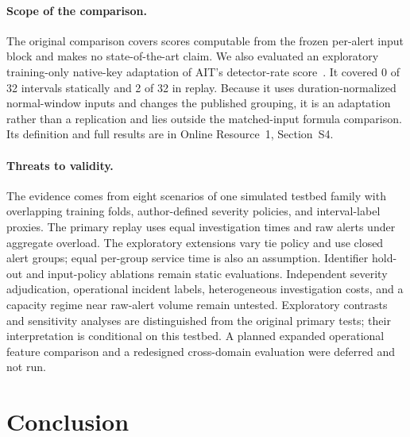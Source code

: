 \documentclass[pdflatex,sn-basic,Numbered]{sn-jnl}
\begin{document}
\paragraph{Scope of the comparison.} The original comparison covers scores computable from the frozen per-alert input block and makes no state-of-the-art claim. We also evaluated an exploratory training-only native-key adaptation of AIT's detector-rate score~\citep{Landauer2024AITADS,AITDetectorScoreImplementation}. It covered 0 of 32 intervals statically and 2 of 32 in replay. Because it uses duration-normalized normal-window inputs and changes the published grouping, it is an adaptation rather than a replication and lies outside the matched-input formula comparison. Its definition and full results are in Online Resource~1, Section~S4.

\paragraph{Threats to validity.} The evidence comes from eight scenarios of one simulated testbed family with overlapping training folds, author-defined severity policies, and interval-label proxies. The primary replay uses equal investigation times and raw alerts under aggregate overload. The exploratory extensions vary tie policy and use closed alert groups; equal per-group service time is also an assumption. Identifier hold-out and input-policy ablations remain static evaluations. Independent severity adjudication, operational incident labels, heterogeneous investigation costs, and a capacity regime near raw-alert volume remain untested. Exploratory contrasts and sensitivity analyses are distinguished from the original primary tests; their interpretation is conditional on this testbed. A planned expanded operational feature comparison and a redesigned cross-domain evaluation were deferred and not run.

\section{Conclusion}
\label{sec:conclusion}
\end{document}
